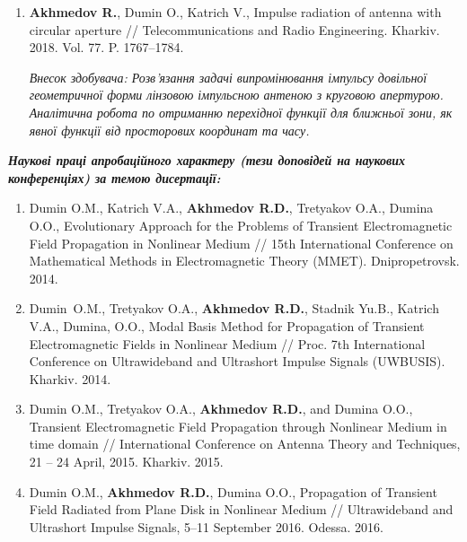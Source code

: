 {\begin{center}
\begin{enumerate}
			\item \textbf{Akhmedov R.}, Dumin O., Katrich V., Impulse radiation of antenna 
			with circular aperture // Telecommunications and Radio Engineering. Kharkiv. 
			2018. Vol. 77. P. 1767--1784.
			
			\textit{Внесок здобувача: Розв'язання задачі випромінювання імпульсу довільної
				геометричної форми лінзовою імпульсною антеною з круговою апертурою. Аналітична
				робота по отриманню перехідної функції для ближньої зони, як явної функції 
				від просторових координат та часу.}
			
			\setcounter{ItemsInMyWriting}{\value{enumi}}
		\end{enumerate}
		
		
		\begin{center} 
			\textit{\textbf{Наукові праці апробаційного характеру (тези доповідей на 
					наукових конференціях) за темою дисертації:}}
		\end{center}
		
		\begin{enumerate}
			\setcounter{enumi}{\value{ItemsInMyWriting}}
			
			\item Dumin O.M., Katrich V.A., \textbf{Akhmedov R.D.}, Tretyakov O.A., 
			Dumina O.O., Evolutionary Approach for the Problems of Transient 
			Electromagnetic Field Propagation in Nonlinear Medium // 15th International 
			Conference on Mathematical Methods in Electromagnetic Theory (MMET).
			Dnipropetrovsk. 2014.
			
			\item Dumin O.M., Tretyakov O.A., \textbf{Akhmedov R.D.}, Stadnik Yu.B., 
			Katrich V.A., Dumina, O.O., Modal Basis Method for Propagation of 
			Transient Electromagnetic Fields in Nonlinear Medium // Proc. 7th 
			International Conference on Ultrawideband and Ultrashort Impulse Signals 
			(UWBUSIS). Kharkiv. 2014.
			
			\item Dumin O.M., Tretyakov O.A., \textbf{Akhmedov R.D.}, and Dumina O.O., 
			Transient Electromagnetic Field Propagation through Nonlinear Medium in 
			time domain // International Conference on Antenna Theory and Techniques, 
			21 -- 24 April, 2015. Kharkiv. 2015.
			
			\item Dumin O.M., \textbf{Akhmedov R.D.}, Dumina O.O., Propagation of 
			Transient Field Radiated from Plane Disk in Nonlinear Medium // 
			Ultrawideband and Ultrashort Impulse Signals, 5--11 September 2016. 
			Odessa. 2016.
			

\end{enumerate}
\end{center}}

